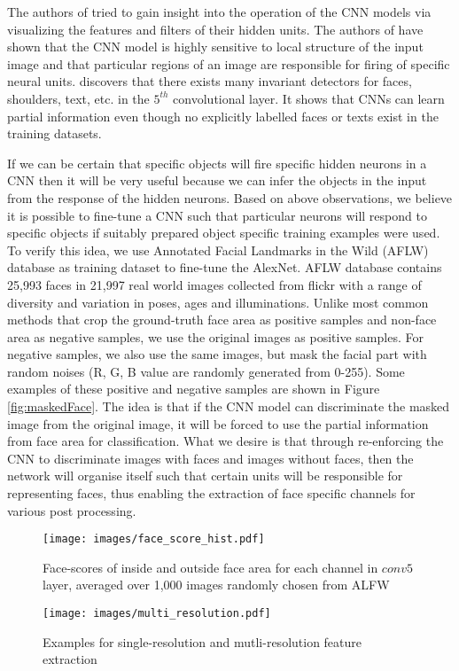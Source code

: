 \documentclass[10pt,twocolumn,letterpaper]{article}
\begin{document}
The authors of \cite{yosinski2015understanding,zeiler2014visualizing} tried to gain insight into the operation of the CNN models via visualizing the features and filters of their hidden units. The authors of \cite{zeiler2014visualizing} have shown that the CNN model is highly sensitive to local structure of the input image and that particular regions of an image are responsible for firing of specific neural units. \cite{yosinski2015understanding} discovers that there exists many invariant detectors for faces, shoulders, text, etc. in the $5^{th}$ convolutional layer. It shows that CNNs can learn partial information even though no explicitly labelled faces or texts exist in the training datasets. 

If we can be certain that specific objects will fire specific hidden neurons in a CNN then it will be very useful because we can infer the objects in the input from the response of the hidden neurons. Based on above observations, we believe it is possible to fine-tune a CNN such that particular neurons will respond to specific objects if suitably prepared object specific training examples were used. To verify this idea, we use Annotated Facial Landmarks in the Wild (AFLW) database \cite{kostinger2011annotated} as training dataset to fine-tune the AlexNet. AFLW database contains 25,993 faces in 21,997 real world images collected from flickr with a range of diversity and variation in poses, ages and illuminations. Unlike most common methods that crop the ground-truth face area as positive samples and non-face area as negative samples, we use the original images as positive samples. For negative samples, we also use the same images, but mask the facial part with random noises (R, G, B value are randomly generated from 0-255). Some examples of these positive and negative samples are shown in Figure \ref{fig:maskedFace}. The idea is that if the CNN model can discriminate the masked image from the original image, it will be forced to use the partial information from face area for classification. What we desire is that through re-enforcing the CNN to discriminate images with faces and images without faces, then the network will organise itself such that certain units will be responsible for representing faces, thus enabling the extraction of face specific channels for various post processing. %


\begin{figure*}[!htb]
\centering
\begin{minipage}{.55\textwidth}
  \centering
  \texttt{[image: images/face\_score\_hist.pdf]}
  \caption{Face-scores of inside and outside face area for each channel in $conv5$ layer, averaged over 1,000 images randomly chosen from ALFW}
  \label{fig:face_score}
\end{minipage}%
\hfill
\begin{minipage}{.4\textwidth}
  \centering
  \texttt{[image: images/multi\_resolution.pdf]}
  \caption{Examples for single-resolution and mutli-resolution feature extraction}
  \label{fig:multi_resolution}
\end{minipage}
\end{figure*}
\end{document}
